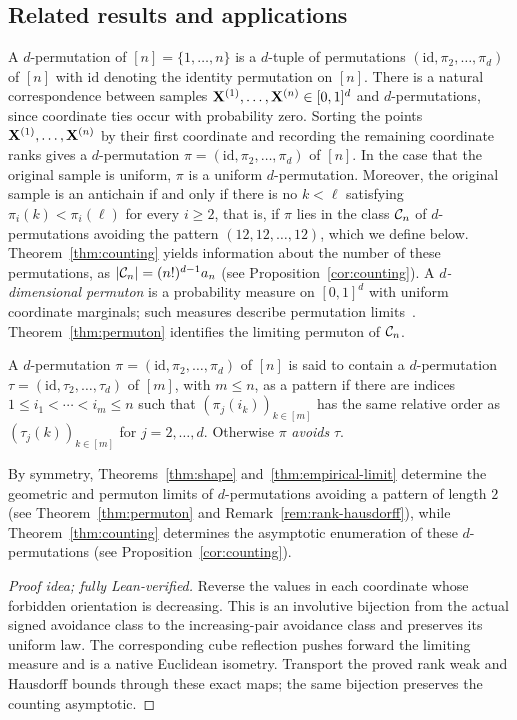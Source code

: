\documentclass[11pt,letterpaper]{article}
\begin{document}
\subsection{Related results and applications}\label{sec:background}
A $d$-permutation of $[n]=\{1,\ldots,n\}$ is a $d$-tuple of permutations $(\mathrm{id},\pi_{2},\ldots,\pi_{d})$ of $[n]$ with $\mathrm{id}$ denoting the identity permutation on $[n]$. There is a natural correspondence between samples $\mathbf X^{(1)},\ldots,\mathbf X^{(n)}\in[0,1]^{d}$ and $d$-permutations, since coordinate ties occur with probability zero. Sorting the points $\mathbf X^{(1)},\ldots,\mathbf X^{(n)}$ by their first coordinate and recording the remaining coordinate ranks gives a $d$-permutation $\pi=(\mathrm{id},\pi_2,\ldots,\pi_d)$ of $[n]$. In the case that the original sample is uniform, $\pi$ is a uniform $d$-permutation. Moreover, the original sample is an antichain if and only if there is no $k<\ell$ satisfying $\pi_i(k)<\pi_i(\ell)$ for every $i\ge2$, that is, if $\pi$ lies in the class $\mathcal C_n$ of $d$-permutations avoiding the pattern $(12,12,\ldots,12)$, which we define below. Theorem~\ref{thm:counting} yields information about the number of these permutations, as $|\mathcal C_n|=(n!)^{d-1}a_n$ (see Proposition~\ref{cor:counting}). A \emph{$d$-dimensional permuton} is a probability measure on $[0,1]^d$ with uniform coordinate marginals; such measures describe permutation limits~\cite{HKMRS,BL}. Theorem~\ref{thm:permuton} identifies the limiting permuton of $\mathcal C_n$.

A $d$-permutation $\pi=(\mathrm{id},\pi_{2},\ldots,\pi_{d})$ of $[n]$ is said to contain a $d$-permutation $\tau=(\mathrm{id},\tau_{2},\ldots,\tau_{d})$ of $[m]$, with $m\le n$, as a pattern if there are indices $1\le i_{1}<\cdots<i_{m}\le n$ such that $(\pi_{j}(i_k))_{k\in[m]}$ has the same relative order as $(\tau_{j}(k))_{k\in[m]}$ for $j=2,\ldots,d$. Otherwise $\pi$ {\em avoids} $\tau$.

By symmetry, Theorems~\ref{thm:shape} and~\ref{thm:empirical-limit} determine the geometric and permuton limits of $d$-permutations avoiding a pattern of length $2$ (see Theorem~\ref{thm:permuton} and Remark~\ref{rem:rank-hausdorff}), while Theorem~\ref{thm:counting} determines the asymptotic enumeration of these $d$-permutations (see Proposition~\ref{cor:counting}).

\begin{proof}[Proof idea; fully Lean-verified]
Reverse the values in each coordinate whose forbidden orientation is decreasing. This is an involutive bijection from the actual signed avoidance class to the increasing-pair avoidance class and preserves its uniform law. The corresponding cube reflection pushes forward the limiting measure and is a native Euclidean isometry. Transport the proved rank weak and Hausdorff bounds through these exact maps; the same bijection preserves the counting asymptotic.
\end{proof}
\end{document}
